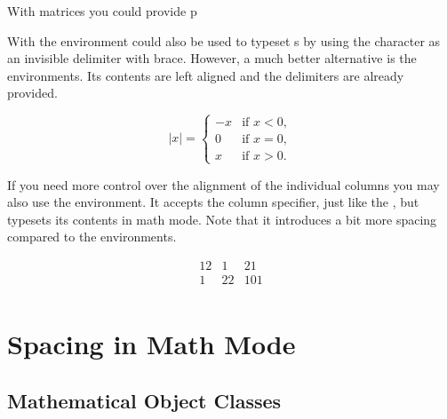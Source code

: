 With matrices you could provide p

With the  environment could also be used to typeset s by using the  character as an invisible 
delimiter with brace. However, a much better alternative is the 
environments. Its contents are left aligned and the delimiters are already
provided.
\begin{example}
\[
  |x| = 
  \begin{cases}
    -x & \text{if } x < 0, \\
    0  & \text{if } x = 0, \\
    x  & \text{if } x > 0.
  \end{cases} 
\]
\end{example}

If you need more control over the alignment of the individual columns you may
also use the  environment. It accepts the column specifier, just like
the , but typesets its contents in math mode. Note that it
introduces a bit more spacing compared to the  environments.
\begin{example}
\[
  \begin{array}{rcl}
    12 & 1 & 21 \\
    1 & 22 & 101 \\
  \end{array}
\]
\end{example}

\section{Spacing in Math Mode}\label{sec:math-spacing}%

\subsection{Mathematical Object Classes}

